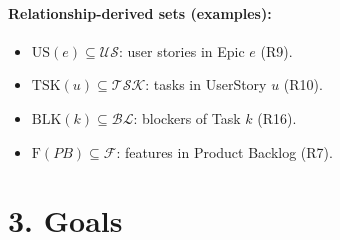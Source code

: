 \documentclass[11pt,a4paper]{article}
\begin{document}
\paragraph{Relationship-derived sets (examples):}
\begin{itemize}[leftmargin=1.2em]
  \item $\mathrm{US}(e) \subseteq \mathcal{US}$: user stories in Epic $e$ (R9).
  \item $\mathrm{TSK}(u) \subseteq \mathcal{TSK}$: tasks in UserStory $u$ (R10).
  \item $\mathrm{BLK}(k) \subseteq \mathcal{BL}$: blockers of Task $k$ (R16).
  \item $\mathrm{F}(PB) \subseteq \mathcal{F}$: features in Product Backlog (R7).
\end{itemize}

\section{3. Goals}
\end{document}
